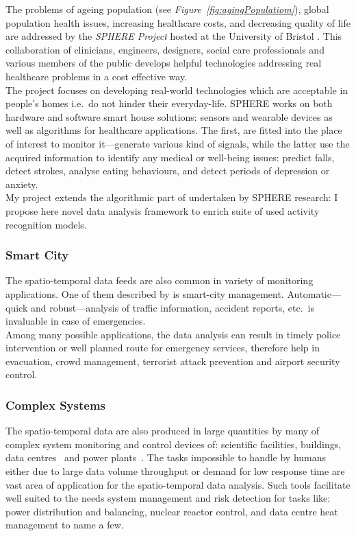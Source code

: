 \documentclass[10pt, a4paper, pdflatex, leqno, twoside, openright]{report}
\begin{document}
The problems of ageing population (see \emph{Figure~\ref{fig:agingPopulatiom}}), global population health issues, increasing healthcare costs, and decreasing quality of life are addressed by the \emph{SPHERE Project} hosted at the University of Bristol \citep{sphere}. This collaboration of clinicians, engineers, designers, social care professionals and various members of the public develops helpful technologies addressing real healthcare problems in a cost effective way.\\
The project focuses on developing real-world technologies which are acceptable in people's homes i.e.\ do not hinder their everyday-life. SPHERE works on both hardware and software smart house solutions: sensors and wearable devices as well as algorithms for healthcare applications. The first, are fitted into the place of interest to monitor it---generate various kind of signals, while the latter use the acquired information to identify any medical or well-being issues: predict falls, detect strokes, analyse eating behaviours, and detect periods of depression or anxiety.\\

My project extends the algorithmic part of undertaken by SPHERE research: I propose here novel data analysis framework to enrich suite of used activity recognition models.

      \subsubsection{Smart City}
The spatio-temporal data feeds are also common in variety of monitoring applications. One of them described by \citet{filipponi2010smart} is smart-city management. Automatic---quick and robust---analysis of traffic information, accident reports, etc.\ is invaluable in case of emergencies.\\
Among many possible applications, the data analysis can result in timely police intervention or well planned route for emergency services, therefore help in evacuation, crowd management, terrorist attack prevention and airport security control.

      \subsubsection{Complex Systems}
The spatio-temporal data are also produced in large quantities by many of complex system monitoring and control devices of: scientific facilities, buildings, data centres~\citep{moore2005data} and power plants~\citep{amin2005toward}. 
The tasks impossible to handle by humans either due to large data volume throughput or demand for low response time are vast area of application for the spatio-temporal data analysis. Such tools facilitate well suited to the needs system management and risk detection for tasks like: power distribution and balancing, nuclear reactor control, and data centre heat management to name a few.
\end{document}
